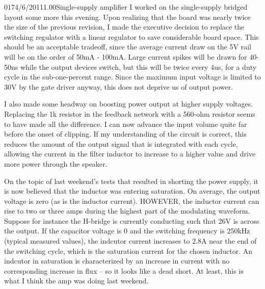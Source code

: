 \documentclass[12pt,letterpaper,onecolumn]{article}
\begin{document}
\begin{nbentry}{017}{4/6/2011}{1.00}{Single-supply amplifier}
I worked on the single-supply bridged layout some more this evening.  Upon realizing that the board was nearly twice the size of the previous revision, I made the executive decision to replace the switching regulator with a linear regulator to save considerable board space.  This should be an acceptable tradeoff, since the average current draw on the 5V rail will be on the order of 50mA - 100mA.  Large current spikes will be drawn for 40-50ns while the output devices switch, but this will be twice every 4us, for a duty cycle in the sub-one-percent range.  Since the maximum input voltage is limited to 30V by the gate driver anyway, this does not deprive us of output power.

I also made some headway on boosting power output at higher supply voltages.  Replacing the 1k resistor in the feedback network with a 560-ohm resistor seems to have made all the difference.  I can now advance the input volume quite far before the onset of clipping.  If my understanding of the circuit is correct, this reduces the amount of the output signal that is integrated with each cycle, allowing the current in the filter inductor to increase to a higher value and drive more power through the speaker.

On the topic of last weekend's tests that resulted in shorting the power supply, it is now believed that the inductor was entering saturation.  On average, the output voltage is zero (as is the inductor current).  HOWEVER, the inductor current can rise to two or three amps during the highest part of the modulating waveform.  Suppose for instance the H-bridge is currently conducting such that 26V is across the output.  If the capacitor voltage is 0 and the switching frequency is 250kHz (typical measured values), the indcutor current increases to 2.8A near the end of the switching cycle, which is the saturation current for the chosen inductor.  An indcutor in saturation is characterized by an increase in current with no corresponding increase in flux -- so it looks like a dead short.  At least, this is what I think the amp was doing last weekend.
\end{nbentry}
\end{document}
